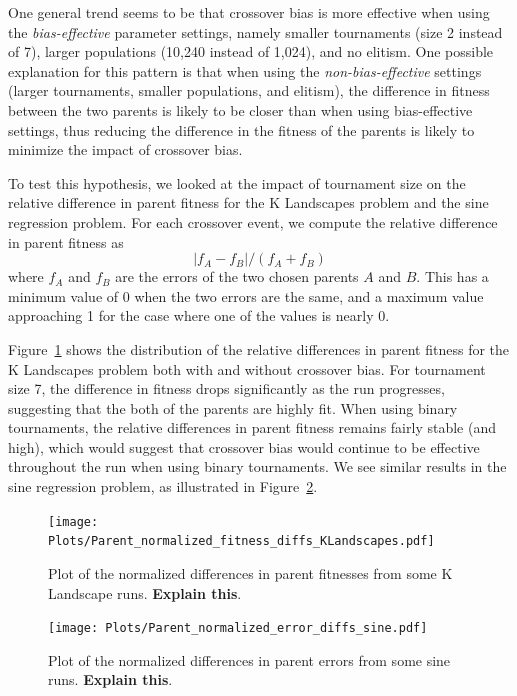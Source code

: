 \documentclass{sig-alternate}
\begin{document}
One general trend seems to be that crossover bias is more effective when using the \emph{bias-effective} parameter
settings, namely smaller tournaments (size 2 instead of 7), larger populations (10,240 instead of 1,024), and no
elitism. One possible explanation for this pattern is that when using the \emph{non-bias-effective} settings (larger
tournaments, smaller populations, and elitism), the difference in fitness between the two parents is likely to be
closer than when using bias-effective settings, thus reducing the difference in the fitness of the parents is likely to
minimize the impact of crossover bias.


To test this hypothesis, we looked at the impact of tournament size on the relative difference in parent fitness for
the K Landscapes problem and the sine regression problem. For each crossover event, we compute the relative difference
in parent fitness as
\[
	|f_A - f_B| / (f_A + f_B)
\]
where $f_A$ and $f_B$ are the errors of the two chosen parents $A$ and $B$. This has a minimum value of 0 when the two
errors are the same, and a maximum value approaching 1 for the case where one of the values is nearly 0.

Figure~\ref{fig:parentDiffsKLandscapes} shows the distribution of the relative differences in parent fitness for the K
Landscapes problem both with and without crossover bias. For tournament size 7, the difference in fitness drops
significantly as the run progresses, suggesting that the both of the parents are highly fit. When using binary
tournaments, the relative differences in parent fitness remains fairly stable (and high), which would suggest that
crossover bias would continue to be effective throughout the run when using binary tournaments. We see similar results
in the sine regression problem, as illustrated in Figure~\ref{fig:parentDiffsSine}.

\begin{figure}
\centering
\texttt{[image: Plots/Parent\_normalized\_fitness\_diffs\_KLandscapes.pdf]}
\caption{Plot of the normalized differences in parent fitnesses from some K Landscape runs. \textbf{Explain this}.}
\label{fig:parentDiffsKLandscapes}
\end{figure}

\begin{figure}
	\centering
	\texttt{[image: Plots/Parent\_normalized\_error\_diffs\_sine.pdf]}
	\caption{Plot of the normalized differences in parent errors from some sine runs. \textbf{Explain this}.}
	\label{fig:parentDiffsSine}
\end{figure}
\end{document}

